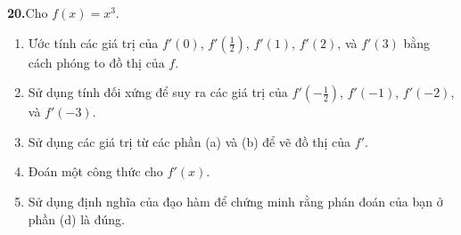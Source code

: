 \begin{minipage}[t]{0.48\textwidth}
  \vspace{0.3em}
  \noindent\llap{\casicon\hspace{4pt}}\textbf{20.}\enspace Cho $f(x) = x^3$.
  \begin{enumerate}[label=(\alph*), leftmargin=*, topsep=2pt, itemsep=1.5pt]
    \item Ước tính các giá trị của $f'(0)$, $f'(\frac{1}{2})$, $f'(1)$, $f'(2)$, và $f'(3)$ bằng cách phóng to đồ thị của $f$.
    \item Sử dụng tính đối xứng để suy ra các giá trị của $f'(-\frac{1}{2})$, $f'(-1)$, $f'(-2)$, và $f'(-3)$.
    \item Sử dụng các giá trị từ các phần (a) và (b) để vẽ đồ thị của $f'$.
    \item Đoán một công thức cho $f'(x)$.
    \item Sử dụng định nghĩa của đạo hàm để chứng minh rằng phán đoán của bạn ở phần (d) là đúng.
  \end{enumerate}
\end{minipage}%
\hfill
